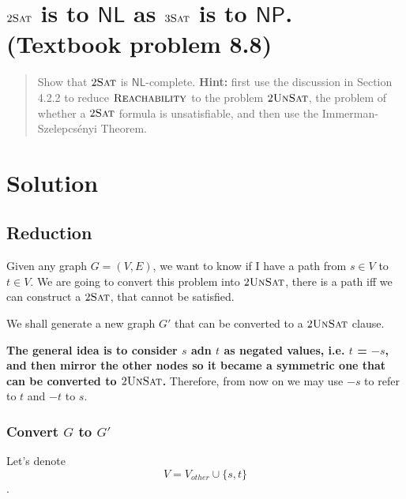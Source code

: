 

\maketitle
\thispagestyle{firststyle}
\vspace{-2.0cm}

\section{$2\textsc{Sat}$ is to $\mathsf{NL}$ as $3\textsc{Sat}$ is to $\mathsf{NP}$. (Textbook problem 8.8)}
\begin{quote}
      Show that $2\textsc{Sat}$ is $\mathsf{NL}$-complete.
      {\bf Hint:} first use the discussion in Section 4.2.2 to reduce
      $\textsc{Reachability}$ to the problem $2\textsc{UnSat}$,
      the problem of whether a $2\textsc{Sat}$ formula is unsatisfiable,
      and then use the Immerman-Szelepcs\'{e}nyi Theorem.
\end{quote}

\section*{Solution}

\subsection*{Reduction}

Given any graph $G = (V, E)$, we want to know if I have a path from  $s \in V$ to $t \in V$.
We are going to convert this problem into $2\textsc{UnSat}$, there is a path iff we can construct a $2\textsc{Sat}$, that cannot be satisfied.

We shall generate a new graph $G'$ that can be converted to a $2\textsc{UnSat}$ clause.

\textbf{The general idea is to consider $s$ adn $t$ as negated values, i.e. $t$ = $-s$, and then mirror the other nodes so it became a symmetric one that can be converted to $2\textsc{UnSat}$.}
Therefore, from now on we may use $-s$ to refer to $t$ and $-t$ to $s$.

\subsubsection*{Convert $G$ to $G'$}

Let's denote $$V = V_{other} \cup \{s, t\}$$.

